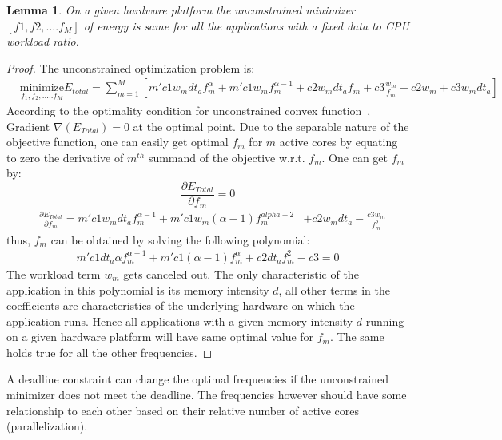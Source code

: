 \documentclass[11pt, letterpaper]{article}
\newtheorem{lemma}{Lemma}
\begin{document}
 \begin{lemma}\label{UnconstrainedOptimization}
  On a given hardware platform the unconstrained minimizer $[f1,f2,....f_M]$ of energy is same for all the applications with a fixed data to CPU workload ratio.
 \end{lemma}
\begin{proof}
The unconstrained optimization problem is:
 \begin{equation}\label{UnconstrainedTotalEnergy}
\begin{aligned}
   &\underset{f_1, f_2, .....f_M}{\text{minimize}} E_{total} = \sum_{m=1}^{M}[m'c1w_mdt_af_m^{\alpha} + m'c1w_mf_m^{\alpha-1}
 + c2w_mdt_af_m + c3\frac{w_m}{f_m} +c2w_m + c3w_mdt_a]
 \end{aligned}
 \end{equation}
According to the optimality condition for unconstrained convex function~\cite{Boyd}, Gradient $\nabla(E_{Total}) = 0$ at the optimal point. Due to the separable nature of the objective function, one can easily get optimal $f_m$ for $m$ active cores by equating to zero the derivative of $m^{th}$ summand of the objective w.r.t. $f_m$.
 One can get $f_m$ by: 
 $$\frac{\partial E_{Total}}{\partial f_m} = 0$$
 \begin{displaymath}
 \begin{aligned}
  &\frac{\partial E_{Total}}{\partial f_m} = m'c1w_mdt_af_m^{\alpha-1} + m'c1w_m(\alpha -1)f_m^{alpha-2} 
  & + c2w_mdt_a -\frac{c3w_m}{f_m^2} 
  \end{aligned}
 \end{displaymath}
 thus, $f_m$ can be obtained by solving the following polynomial:
  \begin{equation}\label{UnconstrainedOptimizer}
 \begin{aligned}
  m'c1dt_a\alpha f_m^{\alpha +1} + m'c1(\alpha-1)f_m^{\alpha} + c2dt_af_m^2 -c3 = 0
  \end{aligned}
 \end{equation}
 The workload term $w_m$ gets canceled out. The only characteristic of the application in this polynomial is its memory intensity $d$, all other terms in the coefficients are characteristics of the underlying hardware on which the application runs. Hence all applications with a given memory intensity $d$ running on a given hardware platform will have same optimal value for $f_m$. The same holds true for all the other frequencies.
\end{proof}
A deadline constraint can change the optimal frequencies if the unconstrained minimizer does not meet the deadline. The frequencies however should have some relationship to each other based on their relative number of active cores (parallelization).
\end{document}
